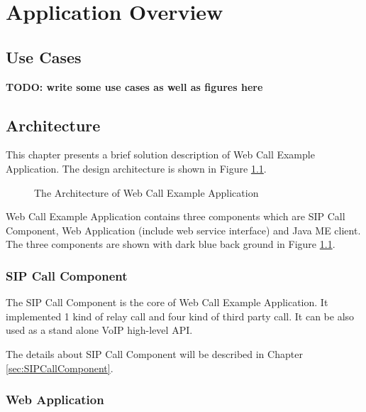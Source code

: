 
\chapter{Application Overview}
\label{sec:ApplicationOverview}

\section{Use Cases}

\textbf{TODO: write some use cases as well as figures here}


\section{Architecture}
\label{sec:ApplicationOverview:ArchitectureOverview}

This chapter presents a brief solution description of Web Call Example Application. The design architecture is shown in Figure \ref{fig:ArchitectureOfWebCallExampleApplication}.

\begin{figure}[!hbtp]
\centering
{}
\caption{The Architecture of Web Call Example Application}
\label{fig:ArchitectureOfWebCallExampleApplication}
\end{figure}

Web Call Example Application contains three components which are SIP Call Component, Web Application (include web service interface) and Java ME client. The three components are shown with dark blue back ground in Figure \ref{fig:ArchitectureOfWebCallExampleApplication}.

\subsection{SIP Call Component}

The SIP Call Component is the core of Web Call Example Application. It implemented 1 kind of relay call and four kind of third party call. It can be also used as a stand alone VoIP high-level API. 

The details about SIP Call Component will be described in Chapter \ref{sec:SIPCallComponent}.

\subsection{Web Application}

